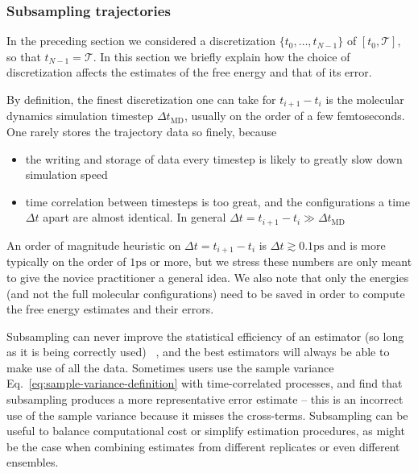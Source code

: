 
\subsubsection{Subsampling trajectories}
\label{sec:subsampling}

In the preceding section we considered a discretization   $\{t_0, \dots, t_{N-1}\}$ of $[t_0,\mathcal{T}]$, so that $t_{N-1}=\mathcal{T}$. In this section we briefly explain how the choice of discretization affects the estimates of the free energy and that of its error. 

By definition, the finest discretization one can take for $t_{i+1} - t_i$ is the molecular dynamics simulation timestep $\Delta t_{\mathrm{MD}}$, usually on the order of a few femtoseconds. One rarely stores the trajectory data so finely, because 
\begin{itemize}
    \item the writing and storage of data every timestep is likely to greatly slow down simulation speed
    \item time correlation between timesteps is too great, and the configurations a time $\Delta t$ apart are almost identical. In general $\Delta t = t_{i+1} - t_i \gg \Delta t_{\mathrm{MD}}$
\end{itemize}

An order of magnitude heuristic on $\Delta t =t_{i+1} - t_i$ is $\Delta t \gtrsim 0.1 \mathrm{ps}$ and is more typically on the order of $1 \mathrm{ps}$ or more,  but we stress these numbers are only meant to give the novice practitioner a general idea. We also note that only the energies (and not the full molecular configurations) need to be saved in order to compute the free energy estimates and their errors. 

Subsampling can never improve the statistical efficiency of an estimator (so long as it is being correctly used) ~\cite{LinkEaton2012,maceachern1994subsampling,geyer1992practical}, and the best estimators will always be able to make use of all the data. Sometimes users use the sample variance Eq.~\ref{eq:sample-variance-definition} with time-correlated processes, and find that subsampling produces a more representative error estimate -- this is an incorrect use of the sample variance because it misses the cross-terms. Subsampling can be useful to balance computational cost or simplify estimation procedures, as might be the case when combining estimates from different replicates or even different ensembles. 

